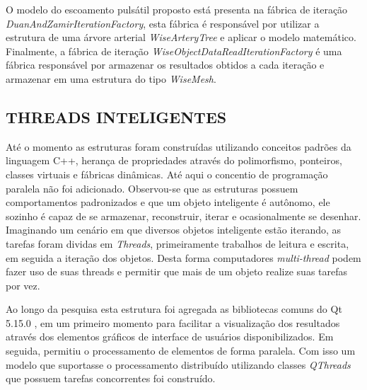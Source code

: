 \documentclass[a4paper,12pt]{monografia}
\theoremstyle{plain}
\theoremstyle{definition}
\theoremstyle{remark}
\begin{document}
O modelo do escoamento pulsátil proposto está presenta na fábrica de iteração \textit{DuanAndZamirIterationFactory}, esta fábrica é responsável por utilizar a estrutura de uma árvore arterial \textit{WiseArteryTree} e aplicar o modelo matemático. Finalmente, a fábrica de iteração \textit{WiseObjectDataReadIterationFactory} é uma fábrica responsável por armazenar os resultados obtidos a cada iteração e armazenar em uma estrutura do tipo \textit{WiseMesh}.

\subsection{THREADS INTELIGENTES}\label{sec:threads}

Até o momento as estruturas foram construídas utilizando conceitos padrões da linguagem C++, herança de propriedades através do polimorfismo, ponteiros, classes virtuais e fábricas dinâmicas. Até aqui o concentio de programação paralela não foi adicionado. Observou-se que as estruturas possuem comportamentos padronizados e que um objeto inteligente é autônomo, ele sozinho é capaz de se armazenar, reconstruir, iterar e ocasionalmente se desenhar. Imaginando um cenário em que diversos objetos inteligente estão iterando, as tarefas foram dividas em \textit{Threads}, primeiramente trabalhos de leitura e escrita, em seguida a iteração dos objetos. Desta forma computadores \textit{multi-thread} podem fazer uso de suas threads e permitir que mais de um objeto realize suas tarefas por vez.

Ao longo da pesquisa esta estrutura foi agregada as bibliotecas comuns do Qt 5.15.0 \cite{QTClasses}, em um primeiro momento para facilitar a visualização dos resultados através dos elementos gráficos de interface de usuários disponibilizados. Em seguida, permitiu o processamento de elementos de forma paralela. Com isso um modelo que suportasse o processamento distribuído utilizando classes \textit{QThreads} que possuem tarefas concorrentes foi construído.
\end{document}
